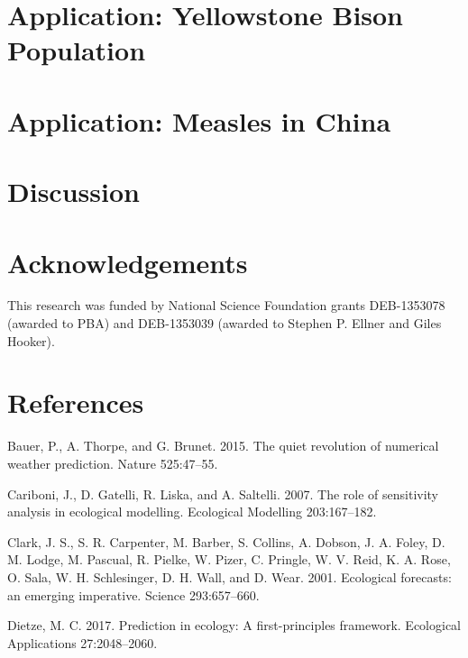 \documentclass[12pt,]{article}
\begin{document}
\hypertarget{application-yellowstone-bison-population}{%
\section{Application: Yellowstone Bison
Population}\label{application-yellowstone-bison-population}}

\hypertarget{application-measles-in-china}{%
\section{Application: Measles in
China}\label{application-measles-in-china}}

\hypertarget{discussion}{%
\section{Discussion}\label{discussion}}

\hypertarget{acknowledgements}{%
\section{Acknowledgements}\label{acknowledgements}}

This research was funded by National Science Foundation grants
DEB-1353078 (awarded to PBA) and DEB-1353039 (awarded to Stephen P.
Ellner and Giles Hooker).

\setlength{\parindent}{0pt}

\hypertarget{references}{%
\section{References}\label{references}}

\hypertarget{refs}{}
\leavevmode\hypertarget{ref-Bauer2015}{}%
Bauer, P., A. Thorpe, and G. Brunet. 2015. The quiet revolution of
numerical weather prediction. Nature 525:47--55.

\leavevmode\hypertarget{ref-Cariboni2007}{}%
Cariboni, J., D. Gatelli, R. Liska, and A. Saltelli. 2007. The role of
sensitivity analysis in ecological modelling. Ecological Modelling
203:167--182.

\leavevmode\hypertarget{ref-Clark2001}{}%
Clark, J. S., S. R. Carpenter, M. Barber, S. Collins, A. Dobson, J. A.
Foley, D. M. Lodge, M. Pascual, R. Pielke, W. Pizer, C. Pringle, W. V.
Reid, K. A. Rose, O. Sala, W. H. Schlesinger, D. H. Wall, and D. Wear.
2001. Ecological forecasts: an emerging imperative. Science
293:657--660.

\leavevmode\hypertarget{ref-Dietze2017a}{}%
Dietze, M. C. 2017. Prediction in ecology: A first-principles framework.
Ecological Applications 27:2048--2060.
\end{document}
